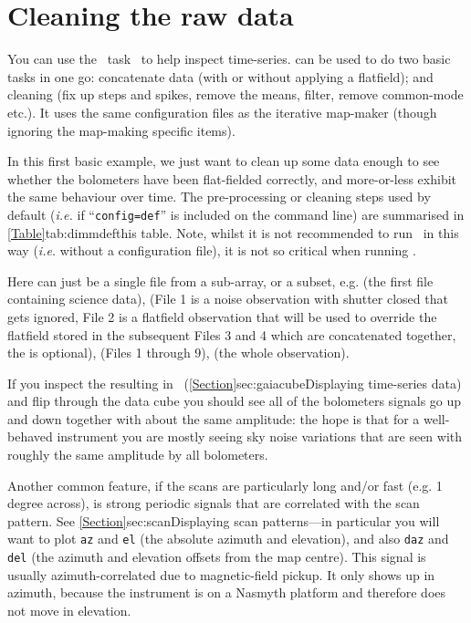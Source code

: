\chapter{Cleaning the raw data}
\label{app:clean}

You can use the \smurf\ task \clean\ to help inspect time-series.
 can be used to do two basic tasks in one go:
concatenate data (with or without applying a flatfield); and cleaning
(fix up steps and spikes, remove the means, filter, remove common-mode
etc.). It uses the same configuration files as the iterative map-maker
(though ignoring the map-making specific items).

In this first basic example, we just want to clean up some data enough
to see whether the bolometers have been flat-fielded correctly, and
more-or-less exhibit the same behaviour over time. The pre-processing
or cleaning steps used by default (\emph{i.e.} if ``\texttt{config=def}''
is included on the command line) are summarised in \cref{Table}{tab:dimmdef}{this
table}. Note, whilst it is not recommended to run \makemap\ in this way
(\emph{i.e.} without a configuration file), it is not so critical when running
\clean.

\begin{terminalv}
\end{terminalv}

Here  can just be a single file from a sub-array, or a
subset, e.g.  (the first file
containing science data),  (File
1 is a noise observation with shutter closed that gets ignored, File 2
is a flatfield observation that will be used to override the flatfield
stored in the subsequent Files 3 and 4 which are concatenated
together, the  is optional),
 (Files 1 through 9),
 (the whole observation).

If you inspect the resulting  in \gaia\
(\cref{Section}{sec:gaiacube}{Displaying time-series data}) and flip
through the data cube you should see all of the bolometers signals go
up and down together with about the same amplitude: the hope is that
for a well-behaved instrument you are mostly seeing sky noise
variations that are seen with roughly the same amplitude by all
bolometers.

Another common feature, if the scans are particularly long and/or fast
(e.g. 1\,degree across), is strong periodic signals that are
correlated with the scan pattern. See
\cref{Section}{sec:scan}{Displaying scan patterns}---in particular you
will want to plot \texttt{az} and \texttt{el} (the absolute azimuth
and elevation), and also \texttt{daz} and \texttt{del} (the azimuth
and elevation offsets from the map centre). This signal is usually
azimuth-correlated due to magnetic-field pickup. It only shows up in
azimuth, because the instrument is on a Nasmyth platform and therefore
does not move in elevation.

